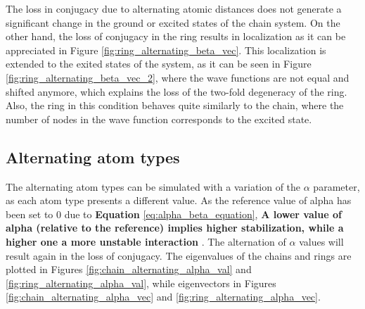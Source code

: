 \documentclass{article}
\begin{document}
The loss in conjugacy due to alternating atomic distances does not generate a significant change in the ground or excited states of the chain system. On the other hand, the loss of conjugacy in the ring results in localization as it can be appreciated in Figure \ref{fig:ring_alternating_beta_vec}. This localization is extended to the exited states of the system, as it can be seen in Figure \ref{fig:ring_alternating_beta_vec_2}, where the wave functions are not equal and shifted anymore, which explains the loss of the two-fold degeneracy of the ring.  Also, the ring in this condition behaves quite similarly to the chain, where the number of nodes in the wave function corresponds to the excited state.

\subsection{Alternating atom types}
The alternating atom types can be simulated with a variation of the $\alpha$ parameter, as each atom type presents a different value. As the reference value of alpha has been set to $0$ due to \textbf{Equation } \ref{eq:alpha_beta_equation}, \textbf{A lower value of alpha (relative to the reference) implies higher stabilization, while a higher one a more unstable interaction }. The alternation of $\alpha$ values will result again in the loss of conjugacy. The eigenvalues of the chains and rings are plotted in Figures \ref{fig:chain_alternating_alpha_val} and \ref{fig:ring_alternating_alpha_val}, while eigenvectors in Figures \ref{fig:chain_alternating_alpha_vec} and \ref{fig:ring_alternating_alpha_vec}.
\end{document}
